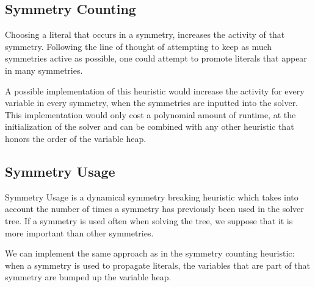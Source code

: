\subsection{Symmetry Counting}

	Choosing a literal that occurs in a symmetry, increases the activity of that symmetry.
	Following the line of thought of attempting to keep as much symmetries active as possible,
	one could attempt to promote literals that appear in many symmetries.

	A possible implementation of this heuristic would increase the activity for every variable in
	every symmetry, when the symmetries are inputted into the solver.
	This implementation would only cost a polynomial amount of runtime, at the initialization of the
	solver and can be combined with any other heuristic that honors the order of the variable heap.

\subsection{Symmetry Usage}
	Symmetry Usage is a dynamical symmetry breaking heuristic
	which takes into account the number of times a symmetry has previously been used in the solver tree.
	If a symmetry is used often when solving the tree, we suppose that it is more important than other symmetries.

	We can implement the same approach as in the symmetry counting heuristic: when a symmetry is
	used to propagate literals, the variables that are part of that symmetry are bumped up the
	variable heap.




